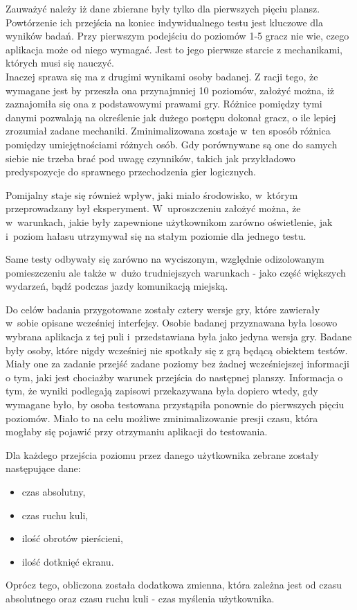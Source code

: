 \documentclass[a4paper,12pt,numbers=noenddot]{report}
\begin{document}
Zauważyć należy iż dane zbierane były tylko dla pierwszych pięciu plansz. Powtórzenie ich przejścia na koniec indywidualnego testu jest kluczowe dla wyników badań. Przy pierwszym podejściu do poziomów 1-5 gracz nie wie, czego aplikacja może od niego wymagać. Jest to jego pierwsze starcie z mechanikami, których musi się nauczyć. \\
Inaczej sprawa się ma z drugimi wynikami osoby badanej. Z racji tego, że wymagane jest by przeszła ona przynajmniej 10 poziomów, założyć można, iż zaznajomiła się ona z podstawowymi prawami gry. Różnice pomiędzy tymi danymi pozwalają na określenie jak dużego postępu dokonał gracz, o ile lepiej zrozumiał zadane mechaniki. Zminimalizowana zostaje w~ten sposób różnica pomiędzy umiejętnościami różnych osób. Gdy porównywane są one do samych siebie nie trzeba brać pod uwagę czynników, takich jak przykładowo predyspozycje do sprawnego przechodzenia gier logicznych.

Pomijalny staje się również wpływ, jaki miało środowisko, w~którym przeprowadzany był eksperyment. W~uproszczeniu założyć można, że w~warunkach, jakie były zapewnione użytkownikom zarówno oświetlenie, jak i~poziom hałasu utrzymywał się na stałym poziomie dla jednego testu.

Same testy odbywały się zarówno na wyciszonym, względnie odizolowanym pomieszczeniu ale także w~dużo trudniejszych warunkach - jako część większych wydarzeń, bądź podczas jazdy komunikacją miejską. 

Do celów badania przygotowane zostały cztery wersje gry, które zawierały w~sobie opisane wcześniej interfejsy. Osobie badanej przyznawana była losowo wybrana aplikacja z tej puli i~przedstawiana była jako jedyna wersja gry. 
Badane były osoby, które nigdy wcześniej nie spotkały się z grą będącą obiektem testów. Miały one za zadanie przejść zadane poziomy bez żadnej wcześniejszej informacji o tym, jaki jest chociażby warunek przejścia do następnej planszy. Informacja o tym, że wyniki podlegają zapisowi przekazywana była dopiero wtedy, gdy wymagane było, by osoba testowana przystąpiła ponownie do pierwszych pięciu poziomów. Miało to na celu możliwe zminimalizowanie presji czasu, która mogłaby się pojawić przy otrzymaniu aplikacji do testowania.

Dla każdego przejścia poziomu przez danego użytkownika zebrane zostały następujące dane:
\begin{itemize}
\item czas absolutny, 
\item czas ruchu kuli,
\item ilość obrotów pierścieni,
\item ilość dotknięć ekranu.
\end{itemize}
Oprócz tego, obliczona została dodatkowa zmienna, która zależna jest od czasu absolutnego oraz czasu ruchu kuli - czas myślenia użytkownika.
\end{document}
